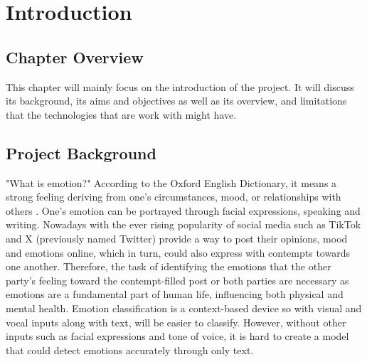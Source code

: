 
\chapter{Introduction}

\singlespaced

\section{Chapter Overview}

This chapter will mainly focus on the introduction of the project. It will discuss its background, its aims and objectives as well as its overview, and limitations that the technologies that are work with might have.

\section{Project Background}

"What is emotion?" According to the Oxford English Dictionary, it means a strong feeling deriving from one's circumstances, mood, or relationships with others \cite{oed:akrasia}.
One's emotion can be portrayed through facial expressions, speaking and writing. 
Nowadays with the ever rising popularity of social media such as TikTok and X (previously named Twitter) provide a way to post their opinions, mood and emotions online, which in turn, could also express with contempts towards one another.
Therefore, the task of identifying the emotions that the other party's feeling toward the contempt-filled post or both parties are necessary as emotions are a fundamental part of human life, influencing both physical and mental health\cite{AMEER2023118534}.
Emotion classification is a context-based device so with visual and vocal inputs along with text, will be easier to classify.
However, without other inputs such as facial expressions and tone of voice, it is hard to create a model that could detect emotions accurately through only text.

